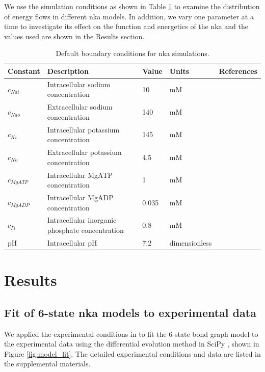 \documentclass{biophys-new}
\newcommand{\rev}[1]{{\color{black} #1}}
\begin{document}
We use the simulation conditions as shown in Table \ref{tab:default_parameters} to examine the distribution of energy flows in different \gls{nka} models. In addition, we vary one parameter at a time to investigate its effect on the function and energetics of the \gls{nka} and the values used are shown in the Results section.

\begin{table}[htbp]
\centering
\begin{tabular}{lllll}
\toprule
\rev{Constant} & Description & Value & Units & References\\
\midrule
$c_{Nai}$ & Intracellular sodium concentration & 10 & mM & \citep{despa_intracellular_2002,bers_intracellular_2003} \\
$c_{Nao}$ & Extracellular sodium concentration & 140 & mM & \citep{despa_intracellular_2002,bers_intracellular_2003} \\
$c_{Ki}$ & Intracellular potassium concentration & 145 & mM & \citep{zacchia_potassium_2016} \\
$c_{Ko}$ & Extracellular potassium concentration & 4.5 & mM & \citep{zacchia_potassium_2016} \\
$c_{MgATP}$ & Intracellular MgATP concentration & 1 & mM & \citep{rhana_fueling_2024} \\
$c_{MgADP}$ & Intracellular MgADP concentration & 0.035 & mM & \citep{dobson_heart_2002} \\
$c_{Pi}$ & Intracellular inorganic phosphate concentration & 0.8 & mM & \citep{tran_regulation_2015} \\
pH & Intracellular pH & 7.2 & dimensionless & \citep{orlowski_intracellular_2025} \\
\bottomrule
\end{tabular}
\caption{Default \rev{boundary conditions} for \gls{nka} simulations.}
\label{tab:default_parameters}
\end{table}

\section*{Results}
\subsection*{Fit of 6-state \gls{nka} models to experimental data}

We applied the experimental conditions in \cite{pan_cardiac_2020} to fit the 6-state bond graph model to the experimental data using the differential evolution method in SciPy \cite{storn1997differential}, shown in Figure \ref{fig:model_fit}. \rev{The detailed experimental conditions and data are listed in the supplemental materials.}
\end{document}
